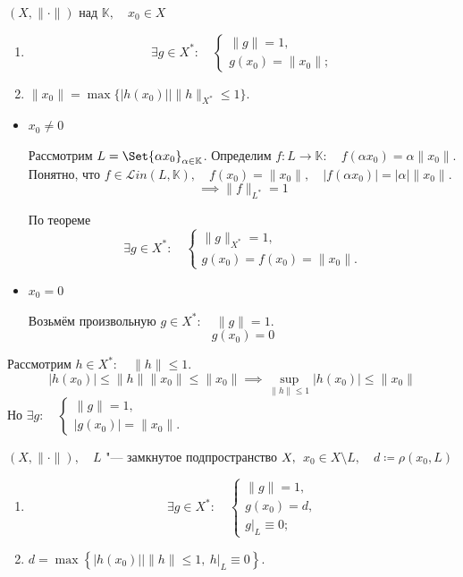 \begin{implication}
	$ (X, \|\cdot\|) $ над $ \mathbb K, \quad x_0 \in X $

	\begin{enumerate}
	\item
		$$ \exists g \in X^* : \quad
		\begin{cases}
			\|g\| = 1, \\
			g(x_0) = \|x_0\|;
		\end{cases} $$
	\item $ \|x_0\| = \max \{|h(x_0)| \mid \|h\|_{X^*} \le 1\} $.
	\end{enumerate}
\end{implication}

\begin{eproof}
\item
	\begin{itemize}
	\item $ x_0 \ne 0 $

		Рассмотрим $ L = \Set{\alpha x_0}_{\alpha \in \mathbb K} $.
		Определим $ f : L \to \mathbb K : \quad f(\alpha x_0) = \alpha \|x_0\| $. \\
		Понятно, что $ f \in \mathscr Lin(L, \mathbb K), \quad f(x_0) = \|x_0\|, \quad
		|f(\alpha x_0)| = |\alpha| \|x_0\| $.
		$$ \implies \|f\|_{L^*} = 1 $$

		По теореме
		$$ \exists g \in X^* : \quad
		\begin{cases}
			\|g\|_{X^*} = 1, \\
			g(x_0) = f(x_0) = \|x_0\|.
		\end{cases} $$
	\item $ x_0 = 0 $

		Возьмём произвольную $ g \in X^* : \quad \|g\| = 1 $.
		$$ g(x_0) = 0 $$
	\end{itemize}
\item Рассмотрим $ h \in X^* : \quad \|h\| \le 1 $.
	$$ |h(x_0)| \le \|h\| \|x_0\| \le \|x_0\| \implies \sup\limits_{\|h\| \le 1}|h(x_0)| \le
	\|x_0\| $$
	Но $ \exists g : \quad
	\begin{cases}
		\|g\| = 1, \\
		|g(x_0)| = \|x_0\|.
	\end{cases} $
\end{eproof}

\begin{implication}
	$ (X, \|\cdot\|), \quad L $ "--- замкнутое подпространство $ X, \\ $
	$ x_0 \in X \setminus L, \quad d \coloneq \rho(x_0, L) $

	\begin{enumerate}
	\item
		$$ \exists g \in X^* : \quad
		\begin{cases}
			\|g\| = 1, \\
			g(x_0) = d, \\
			g \bigr|_L \equiv 0;
		\end{cases} $$
	\item $ d = \max\left\{ |h(x_0)| \mid \|h\| \le 1, ~ h\bigr|_L \equiv 0\right\} $.
	\end{enumerate}
\end{implication}

